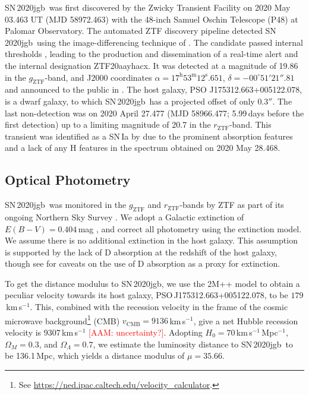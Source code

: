 \documentclass[twocolumn]{aastex631}
\newcommand{\sn}{SN\,2020jgb}
\newcommand{\adam}[1]{\textcolor{red}{[AAM: #1]}}
\newcommand{\chang}[1]{\textcolor{blue}{[Chang: #1]}}
\begin{document}
\sn\ was first discovered by the Zwicky Transient Facility \citep[ZTF;][]{ZTF2019a,ZTF2019b} on 2020 May 03.463 UT (MJD 58972.463) with the 48-inch Samuel Oschin Telescope (P48) at Palomar Observatory. The automated ZTF discovery pipeline \citep{Masci_2019} detected \sn\ using the image-differencing technique of \citet{Zackay_imagesub_2016}. The candidate passed internal thresholds \citep[e.g.,][]{Mahabal_ZTFML_2019, Duev_ZTFML_2019}, leading to the production and dissemination of a real-time alert \citep{Patterson_ZTFalert_2019} and the internal designation ZTF20aayhacx. It was detected at a magnitude of 19.86 in the $g_\mathrm{ZTF}$-band, and J2000 coordinates $\alpha=17^\mathrm{h}53^\mathrm{m}12^\mathrm{s}.651$, $\delta=-00^\circ51'21''.81$ and announced to the public in \citet{Fremling_report_2020}. The host galaxy, PSO J175312.663+005122.078, is a dwarf galaxy, to which \sn\ has a projected offset of only $0.3''$. The last non-detection was on 2020 April 27.477 (MJD 58966.477; 5.99\,days before the first detection) up to a limiting magnitude of 20.7 in the $r_\mathrm{ZTF}$-band. This transient was identified as a SN\,Ia by \citet{TNS_2020} due to the prominent  absorption features and a lack of any H features in the spectrum obtained on 2020 May 28.468.

\subsection{Optical Photometry}
\sn\ was monitored in the $g_\mathrm{ZTF}$ and $r_\mathrm{ZTF}$-bands by ZTF as part of its ongoing Northern Sky Survey \citep{ZTF2019a}. %
We adopt a Galactic extinction of $E(B-V)=0.404\,$mag \citep{Schlafly2011}, and correct all photometry using the \citet{Fitzpatrick1999} extinction model. We assume there is no additional extinction in the host galaxy. This assumption is supported by the lack of  D absorption at the redshift of the host galaxy, though see \citet{Poznanski_2011} for caveats on the use of  D absorption as a proxy for extinction. 

To get the distance modulus to \sn, we use the 2M++ model \citep{Carrick2015_2M++} to obtain a peculiar velocity towards its host galaxy, PSO\,J175312.663+005122.078, to be $179$\,km\,s$^{-1}$. This, combined with the recession velocity in the frame of the cosmic microwave background\footnote{See \url{https://ned.ipac.caltech.edu/velocity_calculator}.} (CMB) $v_\mathrm{CMB}=9136$\,km\,s$^{-1}$, give a net Hubble recession velocity is 9307\,km\,s$^{-1}$ \adam{uncertainty?}. Adopting $H_0=70$\,km\,s$^{-1}$\,Mpc$^{-1}$, $\Omega_M=0.3$, and $\Omega_\Lambda=0.7$, we estimate the luminosity distance to \sn\ to be 136.1\,Mpc, which yields a distance modulus of $\mu=35.66$.
\end{document}
